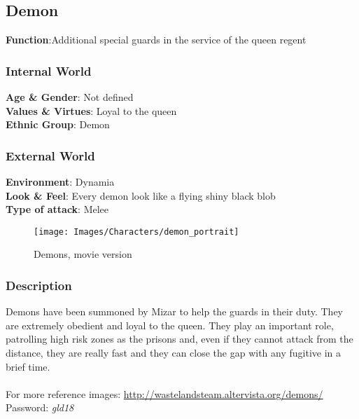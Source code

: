 \subsection{Demon}

\begin{minipage}{0.5\textwidth}
\textbf{Function}:Additional special guards in the service of the queen regent

\subsubsection{Internal World}

\textbf{Age \& Gender}: Not defined \\
\textbf{Values \& Virtues}: Loyal to the queen\\
\textbf{Ethnic Group}: Demon

\subsubsection{External World}
\textbf{Environment}: Dynamia \\
\textbf{Look \& Feel}: Every demon look like a flying shiny black blob\\
\textbf{Type of attack}: Melee \\
\end{minipage}%
%
\hfill\begin{minipage}{0.4\textwidth}
\begin{figure}[H]
 \texttt{[image: Images/Characters/demon\_portrait]}
  \caption{Demons, movie version}
  \end{figure}
\end{minipage}


\subsubsection{Description}
Demons have been summoned by Mizar to help the guards in their duty. They are extremely obedient and loyal to the queen. They play an important role, patrolling high risk zones as the prisons and, even if they cannot attack from the distance, they are really fast and they can close the gap with any fugitive in a brief time.\\\\
For more reference images: \href{http://wastelandsteam.altervista.org/demons/}{http://wastelandsteam.altervista.org/demons/}\\
Password: \textit{gld18}

